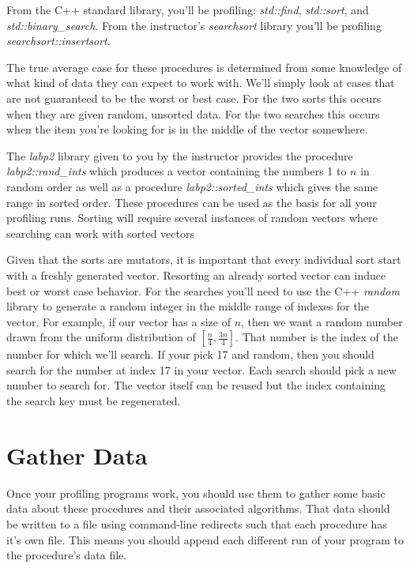 \documentclass[]{tufte-handout}
\begin{document}
From the C++ standard library, you'll be profiling: \textit{std::find}, \textit{std::sort}, and \textit{std::binary\_search}. From the instructor's \textit{searchsort} library you'll be profiling \textit{searchsort::insertsort}.

The true average case for these procedures is determined from some knowledge of what kind of data they can expect to work with. We'll simply look at cases that are not guaranteed to be the worst or best case. For the two sorts this occurs when they are given random, unsorted data. For the two searches this occurs when the item you're looking for is in the middle of the vector somewhere.

The \textit{labp2} library given to you by the instructor provides the procedure \textit{labp2::rand\_ints} which produces a vector containing the numbers 1 to \(n\) in random order as well as a procedure \textit{labp2::sorted\_ints} which gives the same range in sorted order. These procedures can be used as the basis for all your profiling runs.  Sorting will require several instances of random vectors where searching can work with sorted vectors

Given that the sorts are mutators, it is important that every individual sort start with a freshly generated vector. Resorting an already sorted vector can induce best or worst case behavior.  For the searches you'll need to use the C++ \textit{random} library to generate a random integer in the middle range of indexes for the vector. For example, if our vector has a size of \(n\), then we want a random number drawn from the uniform distribution of \( [\frac{n}{4},\frac{3n}{4}] \). That number is the index of the number for which we'll search. If your pick 17 and random, then you should search for the number at index 17 in your vector. Each search should pick a new number to search for.  The vector itself can be reused but the index containing the search key must be regenerated.

\section{Gather Data}

Once your profiling programs work, you should use them to gather some basic data about these procedures and their associated algorithms. That data should be written to a file using command-line redirects such that each procedure has it's own file. This means you should append each different run of your program to the procedure's data file.
\end{document}
